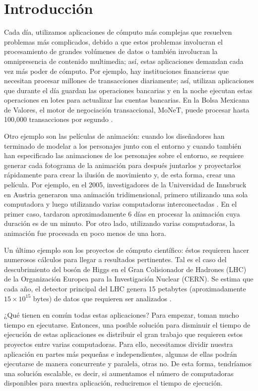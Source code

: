 \chapter{Introducción}

Cada día, utilizamos aplicaciones de cómputo más complejas que resuelven problemas más complicados, debido a que estos problemas involucran el procesamiento de grandes volúmenes de datos o también involucran la omnipresencia de contenido multimedia; así, estas aplicaciones demandan cada vez más poder de cómputo. Por ejemplo, hay instituciones financieras que necesitan procesar millones de transacciones diariamente; así, utilizan aplicaciones que durante el día guardan las operaciones bancarias y en la noche ejecutan estas operaciones en lotes para actualizar las cuentas bancarias. En la Bolsa Mexicana de Valores, el motor de negociación transaccional, MoNeT, puede procesar hasta 100,000 transacciones por segundo \cite{bmv2012informe}. 

Otro ejemplo son las películas de animación: cuando los diseñadores han terminado de modelar a los personajes junto con el entorno y cuando también han especificado las animaciones de los personajes sobre el entorno, se requiere generar cada fotograma de la animación para después juntarlos y proyectarlos rápidamente para crear la ilusión de movimiento y, de esta forma, crear una película. Por ejemplo, en el 2005, investigadores de la Universidad de Innsbruck en Austria generaron una animación tridimensional, primero utilizando una sola computadora y luego utilizando varias computadoras interconectadas \cite{nerieri2005using}. En el primer caso, tardaron aproximadamente 6 días en procesar la animación cuya duración es de un minuto. Por otro lado, utilizando varias computadoras, la animación fue procesada en poco menos de una hora.

Un último ejemplo son los proyectos de cómputo científico: éstos requieren hacer numerosos cálculos para llegar a resultados pertinentes. Tal es el caso del descubrimiento del bosón de Higgs en el Gran Colisionador de Hadrones (LHC) de la Organización Europea para la Investigación Nuclear (CERN). Se estima que cada año, el detector principal del LHC genera 15 petabytes (aproximadamente $15 \times 10^{15}$ bytes) de datos que requieren ser analizados \cite{shiers2007worldwide}. 

¿Qué tienen en común todas estas aplicaciones? Para empezar, toman mucho tiempo en ejecutarse. Entonces, una posible solución para disminuir el tiempo de ejecución de estas aplicaciones es distribuir el gran trabajo que requieren estos proyectos entre varias computadoras. Para ello, necesitamos dividir nuestra aplicación en partes más pequeñas e independientes, algunas de ellas podrán ejecutarse de manera concurrente y paralela, otras no. De esta forma, tendríamos una solución escalable, es decir, si aumentamos el número de computadoras disponibles para nuestra aplicación, reduciremos el tiempo de ejecución.

